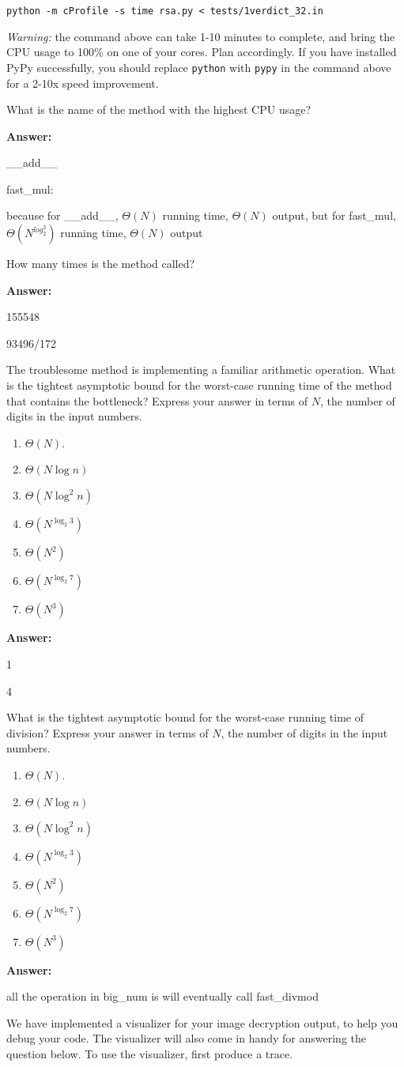 \documentclass[12pt,twoside]{article}
\newcommand{\answer}{
 \par\medskip
 \textbf{Answer:}
}
\newcommand{\answerIIIa}{ \answer 
\_\_add\_\_

{\color{red} fast\_mul: 
	
	because for \_\_add\_\_, $\Theta(N) $ running time,  $ \Theta(N) $ output, but for fast\_mul, $ \Theta(N^{log_2^3}) $ running time, $ \Theta(N) $ output }
}
\newcommand{\answerIIIb}{ \answer
155548

{\color{red} 93496/172}
}
\newcommand{\answerIIIc}{ \answer
1

{\color{red} 4}
}
\newcommand{\answerIIId}{ \answer
all the operation in big_num is will eventually call fast_divmod
}
\begin{document}
\begin{problems}
\begin{problemparts}
\texttt{python -m cProfile -s time rsa.py < tests/1verdict\_32.in}

\textit{Warning:} the command above can take 1-10 minutes to complete, and
bring the CPU usage to 100\% on one of your cores. Plan accordingly. If
you have installed PyPy successfully, you should replace \texttt{python} with
\texttt{pypy} in the command above for a 2-10x speed improvement. 

What is the name of the method with the highest CPU usage?
\answerIIIa

\problempart {} How many times is the method called?
\answerIIIb

\problempart {} The troublesome method is implementing a familiar
arithmetic operation. What is the tightest asymptotic bound for the worst-case
running time of the method that contains the bottleneck? Express your answer in
terms of $N$, the number of digits in the input numbers.
\begin{enumerate}
  \item $\Theta(N)$.
  \item $\Theta(N \log n)$
  \item $\Theta(N \log^2 n)$
  \item $\Theta(N^{\log_{2} 3})$
  \item $\Theta(N^2)$
  \item $\Theta(N^{\log_{2} 7})$
  \item $\Theta(N^3)$
\end{enumerate}
\answerIIIc

\problempart {} What is the tightest asymptotic bound for the worst-case
running time of division? Express your answer in terms of $N$, the number of
digits in the input numbers.
\begin{enumerate}
  \item $\Theta(N)$.
  \item $\Theta(N \log n)$
  \item $\Theta(N \log^2 n)$
  \item $\Theta(N^{\log_{2} 3})$
  \item $\Theta(N^2)$
  \item $\Theta(N^{\log_{2} 7})$
  \item $\Theta(N^3)$
\end{enumerate}
\answerIIId

\end{problemparts}

We have implemented a visualizer for your image decryption output, to help you
debug your code. The visualizer will also come in handy for answering the
question below. To use the visualizer, first produce a trace.


\end{problems}
\end{document}
